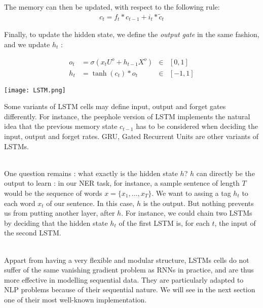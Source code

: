 \documentclass{article}
\begin{document}
\noindent The memory can then be updated, with respect to the following rule:
\begin{align*}
    c_t = f_t * c_{t-1} + i_t * \tilde{c}_t
\end{align*}

\noindent Finally, to update the hidden state, we define the \textit{output gate} in the same fashion, and we update $h_t$ :

\begin{align*}
    o_t &= \sigma \left (x_t U^o + h_{t-1} X^{o}\right ) &\in& [0,1]  \\
    h_t &= \tanh (c_t) * o_t  &\in& [-1, 1]
\end{align*}



\begin{center}
    \label{fig:LSTM1}
    \texttt{[image: LSTM.png]}
\end{center}

Some variants of LSTM cells may define input, output and forget gates differently. For instance,
the peephole version of LSTM implements the natural idea that the previous memory state $c_{t-1}$
has to be considered when deciding the input, output and forget rates.  GRU, Gated Recurrent Units 
are other variants of LSTMs. \\ \par 
One question remains : what exactly is the hidden state $h$? $h$ can directly be the output to learn : in our 
NER task, for instance, a sample sentence of length $T$
would be the sequence of words $x= \{x_1 , ..., x_T  \}$. We want to 
assing a tag $h_t$ to each word $x_t$ of our sentence. In this case, $h$ is the output. But nothing
prevents us from putting another layer, after $h$. For instance, we could chain two LSTMs by deciding 
that the hidden state $h_t$ of the first LSTM is, for each $t$, the input of the second LSTM. \\ \par

Appart from having a very flexible and modular structure, LSTMs cells do not suffer of the same 
vanishing gradient problem as RNNs in practice, and are thus more effective
in modelling sequential data. They are particularly adapted to NLP problems because of their 
sequential nature. We will see in the next section one of their most well-known implementation.  
\end{document}
